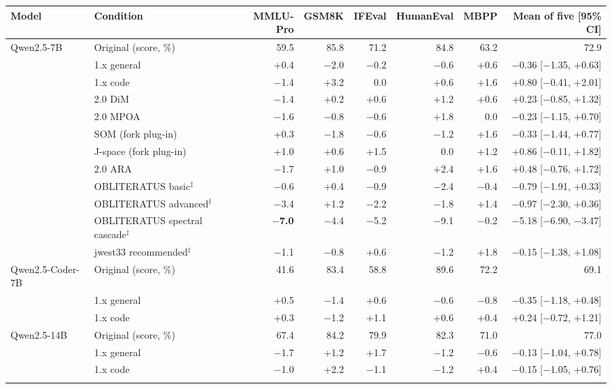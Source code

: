 \begin{tabular}{@{}llrrrrrr@{}}
\toprule
Model & Condition & MMLU-Pro & GSM8K & IFEval & HumanEval & MBPP & Mean of five [95\% CI] \\
\midrule
Qwen2.5-7B & Original (score, \%) & 59.5 & 85.8 & 71.2 & 84.8 & 63.2 & 72.9 \\
 & 1.x general & +0.4 & $-$2.0 & $-$0.2 & $-$0.6 & +0.6 & $-$0.36 [$-$1.35, +0.63] \\
 & 1.x code & $-$1.4 & +3.2 & 0.0 & +0.6 & +1.6 & +0.80 [$-$0.41, +2.01] \\
 & 2.0 DiM & $-$1.4 & +0.2 & +0.6 & +1.2 & +0.6 & +0.23 [$-$0.85, +1.32] \\
 & 2.0 MPOA & $-$1.6 & $-$0.8 & $-$0.6 & +1.8 & 0.0 & $-$0.23 [$-$1.15, +0.70] \\
 & SOM (fork plug-in) & +0.3 & $-$1.8 & $-$0.6 & $-$1.2 & +1.6 & $-$0.33 [$-$1.44, +0.77] \\
 & J-space (fork plug-in) & +1.0 & +0.6 & +1.5 & 0.0 & +1.2 & +0.86 [$-$0.11, +1.82] \\
 & 2.0 ARA & $-$1.7 & +1.0 & $-$0.9 & +2.4 & +1.6 & +0.48 [$-$0.76, +1.72] \\
 & OBLITERATUS basic$^{\ddagger}$ & $-$0.6 & +0.4 & $-$0.9 & $-$2.4 & $-$0.4 & $-$0.79 [$-$1.91, +0.33] \\
 & OBLITERATUS advanced$^{\ddagger}$ & $-$3.4 & +1.2 & $-$2.2 & $-$1.8 & +1.4 & $-$0.97 [$-$2.30, +0.36] \\
 & OBLITERATUS spectral cascade$^{\ddagger}$ & \textbf{$-$7.0} & $-$4.4 & $-$5.2 & $-$9.1 & $-$0.2 & $-$5.18 [$-$6.90, $-$3.47] \\
 & jwest33 recommended$^{\ddagger}$ & $-$1.1 & $-$0.8 & +0.6 & $-$1.2 & +1.8 & $-$0.15 [$-$1.38, +1.08] \\
\addlinespace[2pt]
Qwen2.5-Coder-7B & Original (score, \%) & 41.6 & 83.4 & 58.8 & 89.6 & 72.2 & 69.1 \\
 & 1.x general & +0.5 & $-$1.4 & +0.6 & $-$0.6 & $-$0.8 & $-$0.35 [$-$1.18, +0.48] \\
 & 1.x code & +0.3 & $-$1.2 & +1.1 & +0.6 & +0.4 & +0.24 [$-$0.72, +1.21] \\
\addlinespace[2pt]
Qwen2.5-14B & Original (score, \%) & 67.4 & 84.2 & 79.9 & 82.3 & 71.0 & 77.0 \\
 & 1.x general & $-$1.7 & +1.2 & +1.7 & $-$1.2 & $-$0.6 & $-$0.13 [$-$1.04, +0.78] \\
 & 1.x code & $-$1.0 & +2.2 & $-$1.1 & $-$1.2 & +0.4 & $-$0.15 [$-$1.05, +0.76] \\
\addlinespace[2pt]

\end{tabular}
